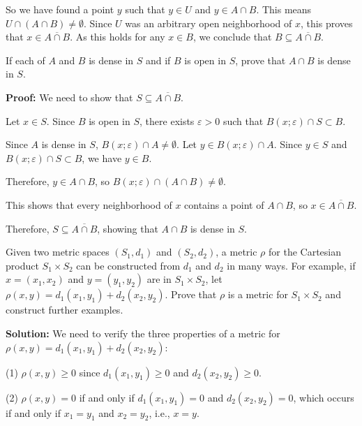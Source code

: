 So we have found a point $y$ such that $y \in U$ and $y \in A \cap B$. This means $U \cap (A \cap B) \neq \emptyset$.
Since $U$ was an arbitrary open neighborhood of $x$, this proves that $x \in \overline{A \cap B}$.
As this holds for any $x \in B$, we conclude that $B \subseteq \overline{A \cap B}$.


\begin{problembox}
If each of \( A \) and \( B \) is dense in \( S \) and if \( B \) is open in \( S \), prove that \( A \cap B \) is dense in \( S \).
\end{problembox}

\textbf{Proof:} We need to show that $S \subseteq \overline{A \cap B}$.

Let $x \in S$. Since $B$ is open in $S$, there exists $\varepsilon > 0$ such that $B(x;\varepsilon) \cap S \subset B$.

Since $A$ is dense in $S$, $B(x;\varepsilon) \cap A \neq \emptyset$. Let $y \in B(x;\varepsilon) \cap A$. Since $y \in S$ and $B(x;\varepsilon) \cap S \subset B$, we have $y \in B$.

Therefore, $y \in A \cap B$, so $B(x;\varepsilon) \cap (A \cap B) \neq \emptyset$.

This shows that every neighborhood of $x$ contains a point of $A \cap B$, so $x \in \overline{A \cap B}$.

Therefore, $S \subseteq \overline{A \cap B}$, showing that $A \cap B$ is dense in $S$.

\begin{problembox}
Given two metric spaces \((S_1, d_1)\) and \((S_2, d_2)\), a metric \( \rho \) for the Cartesian product \( S_1 \times S_2 \) can be constructed from \( d_1 \) and \( d_2 \) in many ways. For example, if \( x = (x_1, x_2) \) and \( y = (y_1, y_2) \) are in \( S_1 \times S_2 \), let \( \rho(x, y) = d_1(x_1, y_1) + d_2(x_2, y_2) \). Prove that \( \rho \) is a metric for \( S_1 \times S_2 \) and construct further examples.
\end{problembox}

\textbf{Solution:} We need to verify the three properties of a metric for $\rho(x,y) = d_1(x_1,y_1) + d_2(x_2,y_2)$:

(1) $\rho(x,y) \geq 0$ since $d_1(x_1,y_1) \geq 0$ and $d_2(x_2,y_2) \geq 0$.

(2) $\rho(x,y) = 0$ if and only if $d_1(x_1,y_1) = 0$ and $d_2(x_2,y_2) = 0$, which occurs if and only if $x_1 = y_1$ and $x_2 = y_2$, i.e., $x = y$.

